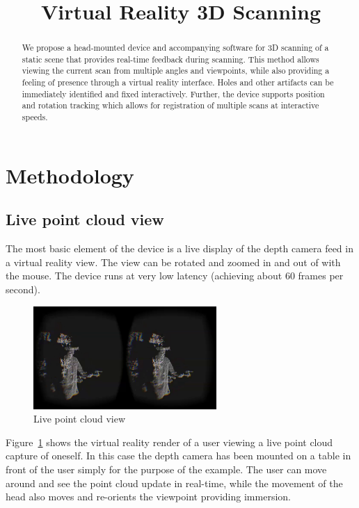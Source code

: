 \documentclass[pageno]{jpaper}
\begin{document}
\title{Virtual Reality 3D Scanning}

\date{}
\maketitle

\thispagestyle{empty}

\begin{abstract}
  We propose a head-mounted device and accompanying software for 3D scanning of
  a static scene that provides real-time feedback during scanning. This method
  allows viewing the current scan from multiple angles and viewpoints, while also
  providing a feeling of presence through a virtual reality interface. Holes and
  other artifacts can be immediately identified and fixed interactively. Further,
  the device supports position and rotation tracking which allows for registration
  of multiple scans at interactive speeds.
\end{abstract}

\section{Methodology}

\subsection{Live point cloud view}
\label{sec:live-view}

The most basic element of the device is a live display of the depth camera feed
in a virtual reality view. The view can be rotated and zoomed in and out of with
the mouse. The device runs at very low latency (achieving about 60 frames per
second).

\begin{figure}
  \centering
    \includegraphics[width=0.62\textwidth]{shot2.png}
  \caption{Live point cloud view}
  \label{fig:live-view}
\end{figure}

Figure~\ref{fig:live-view} shows the virtual reality render of a user viewing a
live point cloud capture of oneself. In this case the depth camera has been
mounted on a table in front of the user simply for the purpose of the
example. The user can move around and see the point cloud update in real-time,
while the movement of the head also moves and re-orients the viewpoint providing
immersion.
\end{document}
